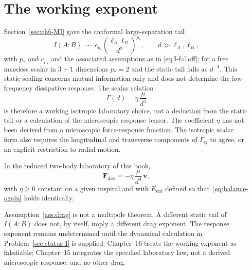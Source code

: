 \section{The working exponent}
\label{sec:ch14-exponent}

Section~\ref{sec:ch6-MI} gave the conformal large-separation tail
\begin{equation}
  \label{eq:I-tail}
  I(A:B)
  \;\sim\;
  c_{p_*}
  \left(\frac{\ell_A\ell_B}{d^2}\right)^{p_*},
  \qquad d\gg\ell_A,\ell_B,
\end{equation}
with \(p_*\) and \(c_{p_*}\) and the associated assumptions as in
\eqref{eq:I-falloff}; for a free massless scalar in \(3+1\)
dimensions \(p_*=2\) and the static tail falls as \(d^{-4}\). This
static scaling concerns mutual information only and does not
determine the low-frequency dissipative response. The scalar relation
\begin{equation}
  \label{eq:Gamma}
  \Gamma(d)
  =\eta\,\frac{\mu}{d^{4}}
\end{equation}
is therefore a working isotropic laboratory choice, not a
deduction from the static tail or a calculation of the microscopic
response tensor. The coefficient \(\eta\) has not been derived
from a microscopic force-response function. The isotropic scalar
form also requires the longitudinal and transverse components of
\(\Gamma_{ij}\) to agree, or an explicit restriction to radial
motion.

\begin{assumption}
  \label{ass:drag}
  In the reduced two-body laboratory of this book,
  \begin{equation}
    \label{eq:Fdiss}
    \mathbf{F}_{\mathrm{diss}}
    =-\eta\,\frac{\mu}{d^{4}}\,\mathbf{v},
  \end{equation}
  with \(\eta\ge 0\) constant on a given inspiral and with
  \(E_{\mathrm{ent}}\) defined so that~\eqref{eq:balance-again}
  holds identically.
\end{assumption}

Assumption~\ref{ass:drag} is not a multipole theorem. A different
static tail of \(I(A:B)\) does not, by itself, imply a different
drag exponent. The response exponent remains undetermined until the
dynamical calculation in Problem~\ref{sec:status-I} is supplied.
Chapter~16 treats the working exponent as falsifiable;
Chapter~15 integrates the specified laboratory law, not a derived
microscopic response, and no other drag.

